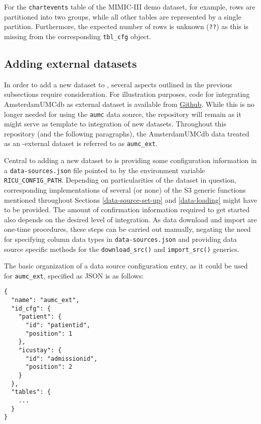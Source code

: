 \documentclass[
  notitle]{jss}
\begin{document}
For the \texttt{chartevents} table of the MIMIC-III demo dataset, for
example, rows are partitioned into two groups, while all other tables
are represented by a single partition. Furthermore, the expected number
of rows is unknown (\texttt{??}) as this is missing from the
corresponding \texttt{tbl\_cfg} object.

\hypertarget{adding-external-datasets}{%
\subsection{Adding external datasets}\label{adding-external-datasets}}

In order to add a new dataset to , several aspects outlined in
the previous subsections require consideration. For illustration
purposes, code for integrating AmsterdamUMCdb as external dataset is
available from \href{https://github.com/eth-mds/aumc}{Github}. While
this is no longer needed for using the \texttt{aumc} data source, the
repository will remain as it might serve as template to integration of
new datasets. Throughout this repository (and the following paragraphs),
the AmsterdamUMCdb data treated as an -external dataset is
referred to as \texttt{aumc\_ext}.

Central to adding a new dataset to  is providing some
configuration information in a \texttt{data-sources.json} file pointed
to by the environment variable \texttt{RICU\_CONFIG\_PATH}. Depending on
particularities of the dataset in question, corresponding
implementations of several (or none) of the S3 generic functions
mentioned throughout Sections \ref{data-source-set-up} and
\ref{data-loading} might have to be provided. The amount of confirmation
information required to get started also depends on the desired level of
integration. As data download and import are one-time procedures, these
steps can be carried out manually, negating the need for specifying
column data types in \texttt{data-sources.json} and providing data
source specific methods for the \texttt{download\_src()} and
\texttt{import\_src()} generics.

The basic organization of a data source configuration entry, as it could
be used for \texttt{aumc\_ext}, specified as JSON is as follows:

\begin{verbatim}
{
  "name": "aumc_ext",
  "id_cfg": {
    "patient": {
      "id": "patientid",
      "position": 1
    },
    "icustay": {
      "id": "admissionid",
      "position": 2
    }
  },
  "tables": {
    ...
  }
}
\end{verbatim}
\end{document}
